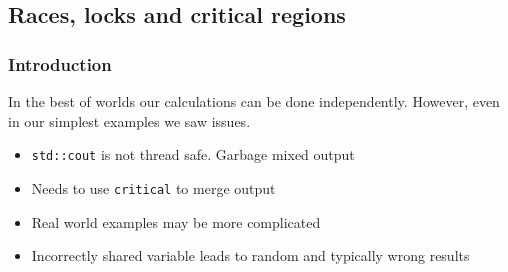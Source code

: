 \begin{Shaded}
\begin{Highlighting}[]

   
\NormalTok{\{}
     
      \NormalTok{;}
      

    \NormalTok{;}
    \NormalTok{;}

    \NormalTok{\{}
         \NormalTok{(} 
        \NormalTok{\{}
            \NormalTok{);}
            \NormalTok{/(} 
        \NormalTok{\}}
    \NormalTok{\}}
     
\NormalTok{\}}
\end{Highlighting}
\end{Shaded}

\subsection{Races, locks and critical
regions}\label{races-locks-and-critical-regions}

\subsubsection{Introduction}\label{introduction-3}

In the best of worlds our calculations can be done independently.
However, even in our simplest examples we saw issues.

\begin{itemize}
\itemsep1pt\parskip0pt
\item
  \texttt{std::cout} is not thread safe. Garbage mixed output
\item
  Needs to use \texttt{critical} to merge output
\item
  Real world examples may be more complicated
\item
  Incorrectly shared variable leads to random and typically wrong
  results
\end{itemize}

